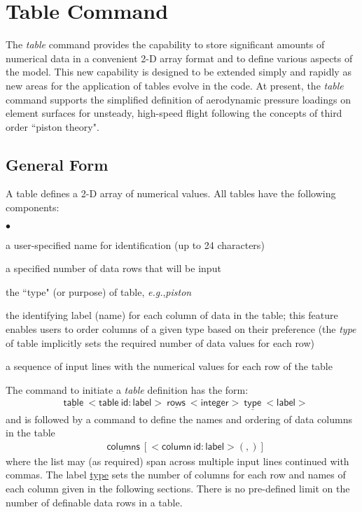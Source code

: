 \documentclass[11pt]{report}
\numberwithin{equation}{section}
\newcommand{\ul} {\underline}
\newcommand{\hv} {\mathsf}   %
\newcommand{\eg}{\emph{e.g.},\xspace}
\newcommand{\ti}{\emph}
\newcommand{\noi}{\noindent}
\newcommand{\squishlist}{
 \begin{list}{$\bullet$}
  { \setlength{\itemsep}{0pt}
     \setlength{\parsep}{3pt}
     \setlength{\topsep}{3pt}
     \setlength{\partopsep}{0pt}
     \setlength{\leftmargin}{1.5em}
     \setlength{\labelwidth}{1em}
     \setlength{\labelsep}{0.5em} } }
\newcommand{\squishend}{
  \end{list}  }
\begin{document}
\section{Table Command}

\noi The \ti{table} command provides the capability to store
significant amounts of numerical data in a convenient
2-D array format and to
define various aspects of the model. This new capability
is designed to be extended simply and rapidly as new areas for
the application of tables evolve in the code. At present, the \ti{table} command
supports the simplified definition of aerodynamic pressure loadings on element
surfaces for unsteady, high-speed flight following the concepts of third order
``piston theory". 
\subsection{General Form}
\noi A table defines a 2-D array of numerical values. All tables
have the following components:
\squishlist
\item a user-specified name for identification (up to 24 characters)
\item a specified number of data rows that will be input
\item the ``type" (or purpose) of table, \eg \ti{piston}
\item the identifying label (name) for each column of data in the table; this feature
enables users to order columns of a given type based on their preference
(the \ti{type} of table implicitly sets the required number of data 
values for each row)
\item a sequence of input lines with the numerical values for each row of the table
\squishend

The command to initiate a \ti{table} definition has the form:
\begin{align*}
& \hv{\ul{table}\ <table\ id:label>\ \ul{rows}\ <integer>\ \ul{type}\ <label> }
\end{align*}
\noi and is followed by a command to define the names and ordering of
data columns in the table
\begin{align*}
& \hv{\ul{columns}\ [ <column\ id:label> (,) ] }
\end{align*}
\noi where the list may (as required) span across multiple input lines continued
with commas. The label \ul{type} sets the number of columns for each row and names
of each column given in the following sections.
There is no pre-defined limit on the number of 
definable data rows in a table.
\end{document}

